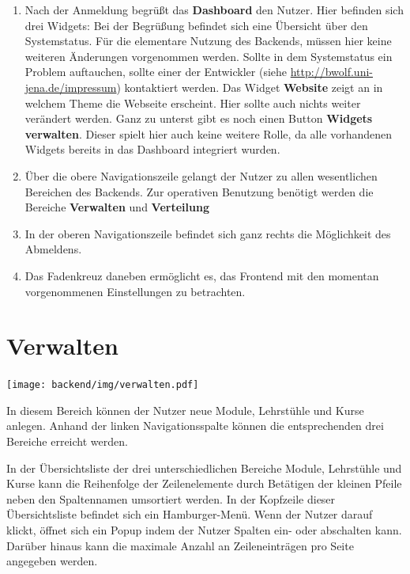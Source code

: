   \begin{enumerate}
   \item Nach der Anmeldung begrüßt das \textbf{Dashboard} den Nutzer. 
	  Hier befinden sich drei Widgets:\newline
	  Bei der Begrüßung befindet sich eine Übersicht über den Systemstatus.\newline
	  Für die elementare Nutzung des Backends, müssen hier keine weiteren Änderungen vorgenommen werden.\newline
	  Sollte in dem Systemstatus ein Problem auftauchen, sollte einer der Entwickler (siehe \url{http://bwolf.uni-jena.de/impressum}) 
	  kontaktiert werden.\newline
	  Das Widget \textbf{Website} zeigt an in welchem Theme die Webseite erscheint. Hier sollte auch nichts weiter verändert werden.
	  Ganz zu unterst gibt es noch einen Button \textbf{Widgets verwalten}. 
	  Dieser spielt hier auch keine weitere Rolle, da alle vorhandenen Widgets bereits in das Dashboard integriert wurden.
   \item Über die obere Navigationszeile gelangt der Nutzer zu allen wesentlichen Bereichen des Backends.
	 Zur operativen Benutzung benötigt werden die Bereiche \textbf{Verwalten} und \textbf{Verteilung}
   \item[] In der oberen Navigationszeile befindet sich ganz rechts die Möglichkeit des Abmeldens.
   \item[] Das Fadenkreuz daneben ermöglicht es, das Frontend mit den momentan vorgenommenen Einstellungen zu betrachten.
  \end{enumerate}

  
  \section{Verwalten}
  \label{section:manage}
  
    \texttt{[image: backend/img/verwalten.pdf]}

    In diesem Bereich können der Nutzer neue Module, Lehrstühle und Kurse anlegen.
    Anhand der linken Navigationsspalte können die entsprechenden drei Bereiche erreicht werden.

    In der Übersichtsliste der drei unterschiedlichen Bereiche Module, Lehrstühle und Kurse kann die Reihenfolge der Zeilenelemente durch Betätigen
    der kleinen Pfeile neben den Spaltennamen umsortiert werden.
    In der Kopfzeile dieser Übersichtsliste befindet sich ein Hamburger-Menü. 
    Wenn der Nutzer darauf klickt, öffnet sich ein Popup indem der Nutzer Spalten ein- oder abschalten kann.
    Darüber hinaus kann die maximale Anzahl an Zeileneinträgen pro Seite angegeben werden.
    
